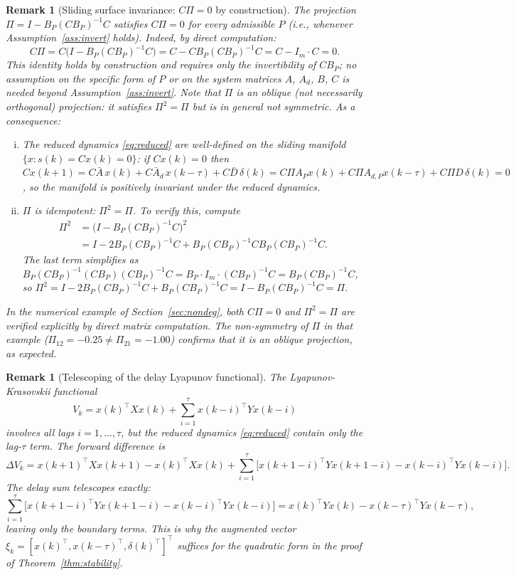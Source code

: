 \documentclass[10pt]{amsart}
\numberwithin{equation}{section}
\newtheorem{remark}[theorem]{Remark}
\begin{document}
\begin{remark}[Sliding surface invariance: $C\Pi = 0$ by construction]
\label{rem:CPi_zero}
The projection $\Pi = I - B_P(CB_P)^{-1}C$ satisfies $C\Pi = 0$ for every admissible
$P$ (i.e., whenever Assumption~\ref{ass:invert} holds). Indeed, by direct computation:
\[
C\Pi = C\bigl(I - B_P(CB_P)^{-1}C\bigr)
     = C - CB_P(CB_P)^{-1}C
     = C - I_m \cdot C
     = 0.
\]
This identity holds by construction and requires only the invertibility of $CB_P$; no
assumption on the specific form of $P$ or on the system matrices $A$, $A_d$, $B$, $C$
is needed beyond Assumption~\ref{ass:invert}. Note that $\Pi$ is an oblique (not
necessarily orthogonal) projection: it satisfies $\Pi^2 = \Pi$ but is in general not
symmetric. As a consequence:
\begin{enumerate}[(i)]
  \item The reduced dynamics \eqref{eq:reduced} are well-defined on the sliding manifold
        $\{x : s(k) = Cx(k) = 0\}$: if $Cx(k)=0$ then
        $Cx(k+1) = C\bar{A}\,x(k) + C\bar{A}_d\,x(k-\tau) + C\bar{D}\,\delta(k)
                 = C\Pi A_P x(k) + C\Pi A_{d,P} x(k-\tau)
                   + C\Pi D\,\delta(k) = 0$,
        so the manifold is positively invariant under the reduced dynamics.
  \item $\Pi$ is idempotent: $\Pi^2 = \Pi$. To verify this, compute
        \begin{align*}
          \Pi^2 &= \bigl(I - B_P(CB_P)^{-1}C\bigr)^2 \\
                &= I - 2B_P(CB_P)^{-1}C
                   + B_P(CB_P)^{-1}C B_P(CB_P)^{-1}C.
        \end{align*}
        The last term simplifies as
        $B_P(CB_P)^{-1}(CB_P)(CB_P)^{-1}C
        = B_P \cdot I_m \cdot (CB_P)^{-1}C = B_P(CB_P)^{-1}C$,
        so $\Pi^2 = I - 2B_P(CB_P)^{-1}C + B_P(CB_P)^{-1}C
        = I - B_P(CB_P)^{-1}C = \Pi$.
\end{enumerate}
In the numerical example of Section~\ref{sec:nondeg}, both $C\Pi = 0$ and $\Pi^2 = \Pi$
are verified explicitly by direct matrix computation. The non-symmetry of $\Pi$ in that
example ($\Pi_{12} = -0.25 \neq \Pi_{21} = -1.00$) confirms that it is an oblique
projection, as expected.
\end{remark}

\begin{remark}[Telescoping of the delay Lyapunov functional]\label{rem:telescope}
The Lyapunov-Krasovskii functional
\[
V_k = x(k)^\top X x(k) + \sum_{i=1}^\tau x(k-i)^\top Y x(k-i)
\]
involves all lags $i=1,\ldots,\tau$, but the reduced dynamics \eqref{eq:reduced}
contain only the lag-$\tau$ term. The forward difference is
\[
\Delta V_k = x(k{+}1)^\top X x(k{+}1) - x(k)^\top X x(k)
             + \sum_{i=1}^\tau \bigl[x(k{+}1{-}i)^\top Y x(k{+}1{-}i)
               - x(k{-}i)^\top Y x(k{-}i)\bigr].
\]
The delay sum telescopes exactly:
\[
\sum_{i=1}^\tau \bigl[x(k{+}1{-}i)^\top Y x(k{+}1{-}i) - x(k{-}i)^\top Y x(k{-}i)\bigr]
= x(k)^\top Y x(k) - x(k-\tau)^\top Y x(k-\tau),
\]
leaving only the boundary terms. This is why the augmented vector
$\xi_k = [x(k)^\top, x(k-\tau)^\top, \delta(k)^\top]^\top$ suffices for the quadratic
form in the proof of Theorem~\ref{thm:stability}.
\end{remark}
\end{document}
